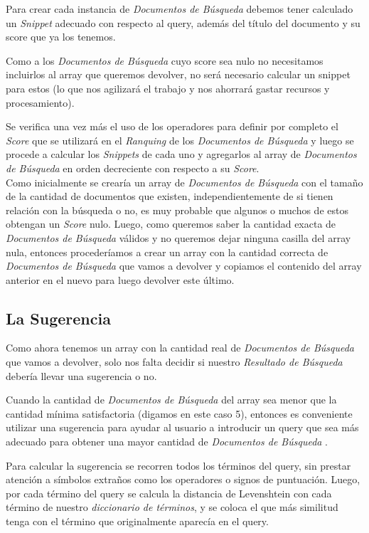 \documentclass[12pt]{article}
\newcommand{\SearchItems}{\emph{Documentos de Búsqueda} }
\newcommand{\SearchResult}{\emph{Resultado de Búsqueda} }
\begin{document}
	Para crear cada instancia de \SearchItems debemos tener calculado un \emph{Snippet} adecuado con respecto al query, además del título del documento y su score que ya los tenemos.
	
	Como a los \SearchItems cuyo score sea nulo no necesitamos incluirlos al array que queremos devolver, no será necesario calcular un snippet para estos (lo que nos agilizará el trabajo y nos ahorrará gastar recursos y procesamiento).
	
	Se verifica una vez más el uso de los operadores para definir por completo el \emph{Score} que se utilizará en el \emph{Ranquing} de los \SearchItems y luego se procede a calcular los \emph{Snippets} de cada uno y agregarlos al array de \SearchItems en orden decreciente con respecto a su \emph{Score}. \\
	
	Como inicialmente se crearía un array de \SearchItems con el tamaño de la cantidad de documentos que existen, independientemente de si tienen relación con la búsqueda o no, es muy probable que algunos o muchos de estos obtengan un \emph{Score} nulo.
	Luego, como queremos saber la cantidad exacta de \SearchItems válidos y no queremos dejar ninguna casilla del array nula, entonces procederíamos a crear un array con la cantidad correcta de \SearchItems que vamos a devolver y copiamos el contenido del array anterior en el nuevo para luego devolver este último.
	
\subsection*{La Sugerencia}
	Como ahora tenemos un array con la cantidad real de \SearchItems que vamos a devolver, solo nos falta decidir si nuestro \SearchResult debería llevar una sugerencia o no.
	
	Cuando la cantidad de \SearchItems del array sea menor que la cantidad mínima satisfactoria (digamos en este caso 5), entonces es conveniente utilizar una sugerencia para ayudar al usuario a introducir un query que sea más adecuado para obtener una mayor cantidad de \SearchItems.
	
	Para calcular la sugerencia se recorren todos los términos del query, sin prestar atención a símbolos extraños como los operadores o signos de puntuación.
	Luego, por cada término del query se calcula la distancia de Levenshtein con cada término de nuestro \emph{diccionario de términos}, y se coloca el que más similitud tenga con el término que originalmente aparecía en el query. \\
	
\end{document}
